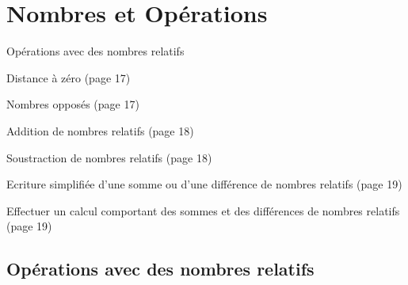 \documentclass[a4paper,11pt]{report}
\begin{document}
\newcommand{\chapterName}{Nombres et Opérations}
\newcommand{\serieName}{Opérations avec des nombres relatifs}


\chapter*{\chapterName}
\thispagestyle{empty}

\begin{amL}{\serieName}{
\item Distance à zéro (page 17)
\item Nombres opposés (page 17)
\item Addition de nombres relatifs (page 18)
\item Soustraction de nombres relatifs (page 18)
\item Ecriture simplifiée d'une somme ou d'une différence de nombres relatifs (page 19)
\item Effectuer un calcul comportant des sommes et des différences de nombres relatifs (page 19)
}
\end{amL}
\section*{\serieName}
\setcounter{page}{1}
\thispagestyle{firstPage}



\end{document}
